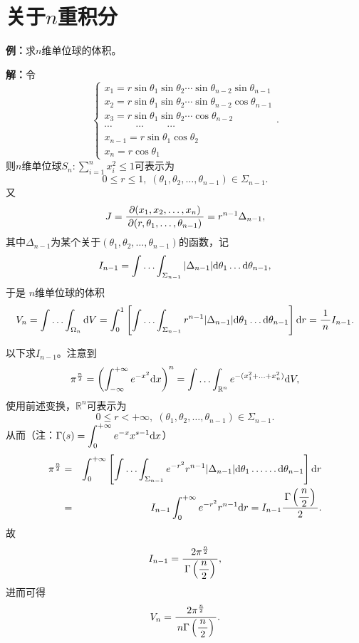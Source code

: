 \ifvisible

\newpage

\section*{关于$n$重积分}

{\bf 例：}求$n$维单位球的体积。

{\bf 解：}令
$$
\left\{
\begin{array}{l}
x_1=r\sin\theta_1\sin\theta_2\cdots\sin\theta_{n-2}\sin\theta_{n-1}\\
x_2=r\sin\theta_1\sin\theta_2\cdots\sin\theta_{n-2}\cos\theta_{n-1}\\
x_3=r\sin\theta_1\sin\theta_2\cdots\cos\theta_{n-2}\\
\cdots\hspace{1cm}\cdots\hspace{1cm}\cdots\\
x_{n-1}=r\sin\theta_1\cos\theta_2\\
x_n=r\cos\theta_1
\end{array}
\right..
$$
则$n$维单位球$S_n:\sum\limits_{i=1}^nx^2_i\leq1$可表示为
$$0\leq r\leq 1,\;(\theta_1,\theta_2,\ldots,\theta_{n-1})\in\Sigma_{n-1}.$$
又
$$J=\displaystyle\frac{\,{\partial(x_1,x_2,\ldots,x_n)}\,}{\,{\partial(r,\theta_1,\ldots,\theta_{n-1})}\,}
=r^{n-1}\Delta_{n-1},$$
其中$\Delta_{n-1}$为某个关于$(\theta_1,\theta_2,\ldots,\theta_{n-1})$的函数，记
$$I_{n-1}=\displaystyle\int\ldots\displaystyle\int_{\Sigma_{n-1}}|\Delta_{n-1}|
\mathrm{d}\theta_1\ldots\mathrm{d}\theta_{n-1},$$
于是
$n$维单位球的体积
$$V_n=\displaystyle\int\ldots\displaystyle\int_{\Omega_n}\mathrm{d} V
=\displaystyle\int_0^1\left[\displaystyle\int\ldots\displaystyle\int_{\Sigma_{n-1}}r^{n-1}|\Delta_{n-1}|
\mathrm{d}\theta_1\ldots\mathrm{d}\theta_{n-1}\right]\mathrm{d} r=\displaystyle\frac{\,{1}\,}{\,{n}\,}I_{n-1}.$$

以下求$I_{n-1}$。注意到
$$\pi^{\frac n2}=\left(\displaystyle\int_{-\infty}^{+\infty}e^{-x^2}\mathrm{d} x\right)^n
=\displaystyle\int\ldots\displaystyle\int_{\mathbb{R}^n}e^{-(x_1^2+\ldots+x_n^2)}\mathrm{d} V,$$
使用前述变换，$\mathbb{R}^n$可表示为
$$0\leq r<+\infty,
\;(\theta_1,\theta_2,\ldots,\theta_{n-1})\in\Sigma_{n-1}.$$
从而（注：$\Gamma(s)=\displaystyle\int_0^{+\infty}e^{-x}x^{s-1}\mathrm{d} x$）
\begin{eqnarray*}
	\pi^{\frac n2}&=&\displaystyle\int_0^{+\infty}
	\left[\displaystyle\int\ldots\displaystyle\int_{\Sigma_{n-1}}e^{-r^2}r^{n-1}|\Delta_{n-1}|
	\mathrm{d}\theta_1\ldots\ldots\mathrm{d}\theta_{n-1}\right]\mathrm{d} r\\
	&=&I_{n-1}\displaystyle\int_0^{+\infty}e^{-r^2}r^{n-1}\mathrm{d} r
	=I_{n-1}\displaystyle\frac{\,{\Gamma\left(\displaystyle\frac{\,{n}\,}{\,{2}\,}\right)}\,}{\,{2}\,}.
\end{eqnarray*}
故
$$I_{n-1}=\displaystyle\frac{\,{2\pi^{\frac n2}}\,}{\,{\Gamma\left(\displaystyle\frac{\,{n}\,}{\,{2}\,}\right)}\,},$$
进而可得
$$V_n=\displaystyle\frac{\,{2\pi^{\frac n2}}\,}{\,{n\Gamma\left(\displaystyle\frac{\,{n}\,}{\,{2}\,}\right)}\,}.$$

